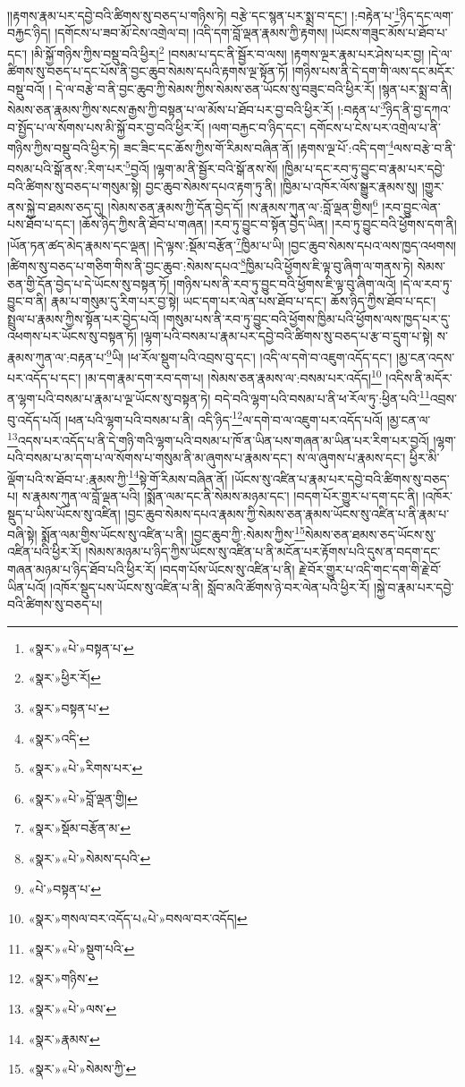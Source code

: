 །།རྟགས་རྣམ་པར་དབྱེ་བའི་ཚིགས་སུ་བཅད་པ་གཉིས་ཏེ། བརྩེ་དང་སྙན་པར་སྨྲ་བ་དང་། །:བརྟེན་པ་\footnote{«སྣར་»«པེ་»བསྟན་པ་}ཉིད་དང་ལག་བརྐྱང་ཉིད། །དགོངས་པ་ཟབ་མོ་ངེས་འགྲེལ་བ། །འདི་དག་བློ་ལྡན་རྣམས་ཀྱི་རྟགས། །ཡོངས་གཟུང་མོས་པ་ཐོབ་པ་དང་། །མི་སྐྱོ་གཉིས་ཀྱིས་བསྡུ་བའི་ཕྱིར།\footnote{«སྣར་»ཕྱིར་རོ།} །བསམ་པ་དང་ནི་སྦྱོར་བ་ལས། །རྟགས་ལྔར་རྣམ་པར་ཤེས་པར་བྱ། །དེ་ལ་ཚིགས་སུ་བཅད་པ་དང་པོས་ནི་བྱང་ཆུབ་སེམས་དཔའི་རྟགས་ལྔ་སྟོན་ཏོ། །གཉིས་པས་ནི་དེ་དག་གི་ལས་དང་མདོར་བསྡུ་བའོ། །
དེ་ལ་བརྩེ་བ་ནི་བྱང་ཆུབ་ཀྱི་སེམས་ཀྱིས་སེམས་ཅན་ཡོངས་སུ་བཟུང་བའི་ཕྱིར་རོ། །སྙན་པར་སྨྲ་བ་ནི། སེམས་ཅན་རྣམས་ཀྱིས་སངས་རྒྱས་ཀྱི་བསྟན་པ་ལ་མོས་པ་ཐོབ་པར་བྱ་བའི་ཕྱིར་རོ། །:བརྟན་པ་\footnote{«སྣར་»བསྟན་པ་}ཉིད་ནི་བྱ་དཀའ་བ་སྤྱོད་པ་ལ་སོགས་པས་མི་སྐྱོ་བར་བྱ་བའི་ཕྱིར་རོ། །ལག་བརྐྱང་བ་ཉིད་དང་། དགོངས་པ་ངེས་པར་འགྲེལ་པ་ནི་གཉིས་ཀྱིས་བསྡུ་བའི་ཕྱིར་ཏེ། ཟང་ཟིང་དང་ཆོས་ཀྱིས་གོ་རིམས་བཞིན་ནོ། །རྟགས་ལྔ་པོ་:འདི་དག་\footnote{«སྣར་»འདི་}ལས་བརྩེ་བ་ནི་བསམ་པའི་སྒོ་ནས་:རིག་པར་\footnote{«སྣར་»«པེ་»རིགས་པར་}བྱའོ། །ལྷག་མ་ནི་སྦྱོར་བའི་སྒོ་ནས་སོ། །ཁྱིམ་པ་དང་རབ་ཏུ་བྱུང་བ་རྣམ་པར་དབྱེ་བའི་ཚིགས་སུ་བཅད་པ་གསུམ་སྟེ། བྱང་ཆུབ་སེམས་དཔའ་རྟག་ཏུ་ནི། །ཁྱིམ་པ་འཁོར་ལོས་སྒྱུར་རྣམས་སུ། །གྱུར་ནས་སྐྱེ་བ་ཐམས་ཅད་དུ། །སེམས་ཅན་རྣམས་ཀྱི་དོན་བྱེད་དོ། །ས་རྣམས་ཀུན་ལ་:བློ་ལྡན་གྱིས།\footnote{«སྣར་»«པེ་»བློ་ལྡན་གྱི།} །རབ་བྱུང་ལེན་པས་ཐོབ་པ་དང་། །ཆོས་ཉིད་ཀྱིས་ནི་ཐོབ་པ་གཞན། །རབ་ཏུ་བྱུང་བ་སྟོན་བྱེད་ཡིན། །རབ་ཏུ་བྱུང་བའི་ཕྱོགས་དག་ནི། །ཡོན་ཏན་ཚད་མེད་རྣམས་དང་ལྡན། །དེ་ལྟས་:སྡོམ་བརྩོན་\footnote{«སྣར་»སྡོམ་བརྩོན་མ་}ཁྱིམ་པ་ཡི། །བྱང་ཆུབ་སེམས་དཔའ་ལས་ཁྱད་འཕགས། །ཚིགས་སུ་བཅད་པ་གཅིག་གིས་ནི་བྱང་ཆུབ་:སེམས་དཔའ་\footnote{«སྣར་»«པེ་»སེམས་དཔའི་}ཁྱིམ་པའི་ཕྱོགས་ཇི་ལྟ་བུ་ཞིག་ལ་གནས་ཏེ། སེམས་ཅན་གྱི་དོན་བྱེད་པ་དེ་ཡོངས་སུ་བསྟན་ཏོ། །གཉིས་པས་ནི་རབ་ཏུ་བྱུང་བའི་ཕྱོགས་ཇི་ལྟ་བུ་ཞིག་ལའོ། །དེ་ལ་རབ་ཏུ་བྱུང་བ་ནི། རྣམ་པ་གསུམ་དུ་རིག་པར་བྱ་སྟེ། ཡང་དག་པར་ལེན་པས་ཐོབ་པ་དང་། ཆོས་ཉིད་ཀྱིས་ཐོབ་པ་དང་། སྤྲུལ་པ་རྣམས་ཀྱིས་སྟོན་པར་བྱེད་པའོ། །གསུམ་པས་ནི་རབ་ཏུ་བྱུང་བའི་ཕྱོགས་ཁྱིམ་པའི་ཕྱོགས་ལས་ཁྱད་པར་དུ་འཕགས་པར་ཡོངས་སུ་བསྟན་ཏོ། །ལྷག་པའི་བསམ་པ་རྣམ་པར་དབྱེ་བའི་ཚིགས་སུ་བཅད་པ་རྩ་བ་དྲུག་པ་སྟེ། ས་རྣམས་ཀུན་ལ་:བརྟན་པ་\footnote{«པེ་»བསྟན་པ་}ཡི། །ཕ་རོལ་སྡུག་པའི་འབྲས་བུ་དང་། །འདི་ལ་དགེ་བ་འཇུག་འདོད་དང་། །མྱ་ངན་འདས་པར་འདོད་པ་དང་། །མ་དག་རྣམ་དག་རབ་དག་པ། །སེམས་ཅན་རྣམས་ལ་:བསམ་པར་འདོད།\footnote{«སྣར་»གསལ་བར་འདོད་པ«པེ་»བསལ་བར་འདོད།} །འདིས་ནི་མདོར་ན་ལྷག་པའི་བསམ་པ་རྣམ་པ་ལྔ་ཡོངས་སུ་བསྟན་ཏེ། བདེ་བའི་ལྷག་པའི་བསམ་པ་ནི་ཕ་རོལ་ཏུ་:ཕྱིན་པའི་\footnote{«སྣར་»«པེ་»སྡུག་པའི་}འབྲས་བུ་འདོད་པའོ། །ཕན་པའི་ལྷག་པའི་བསམ་པ་ནི། འདི་ཉིད་\footnote{«སྣར་»གཉིས་}ལ་དགེ་བ་ལ་འཇུག་པར་འདོད་པའོ། །མྱ་ངན་ལ་\footnote{«སྣར་»«པེ་»ལས་}འདས་པར་འདོད་པ་ནི་དེ་གཉི་གའི་ལྷག་པའི་བསམ་པ་ཁོ་ན་ཡིན་པས་གཞན་མ་ཡིན་པར་རིག་པར་བྱའོ། །ལྷག་པའི་བསམ་པ་མ་དག་པ་ལ་སོགས་པ་གསུམ་ནི་མ་ཞུགས་པ་རྣམས་དང་། ས་ལ་ཞུགས་པ་རྣམས་དང་། ཕྱིར་མི་ལྡོག་པའི་ས་ཐོབ་པ་:རྣམས་ཀྱི་\footnote{«སྣར་»རྣམས་}སྟེ་གོ་རིམས་བཞིན་ནོ། །ཡོངས་སུ་འཛིན་པ་རྣམ་པར་དབྱེ་བའི་ཚིགས་སུ་བཅད་པ། ས་རྣམས་ཀུན་ལ་བློ་ལྡན་པའི། །སྨོན་ལམ་དང་ནི་སེམས་མཉམ་དང་། །བདག་པོར་གྱུར་པ་དག་དང་ནི། །འཁོར་སྡུད་པ་ཡིས་ཡོངས་སུ་འཛིན། །བྱང་ཆུབ་སེམས་དཔའ་རྣམས་ཀྱི་སེམས་ཅན་རྣམས་ཡོངས་སུ་འཛིན་པ་ནི་རྣམ་པ་བཞི་སྟེ། སྨོན་ལམ་གྱིས་ཡོངས་སུ་འཛིན་པ་ནི། །བྱང་ཆུབ་ཀྱི་:སེམས་ཀྱིས་\footnote{«སྣར་»«པེ་»སེམས་ཀྱི་}སེམས་ཅན་ཐམས་ཅད་ཡོངས་སུ་འཛིན་པའི་ཕྱིར་རོ། །སེམས་མཉམ་པ་ཉིད་ཀྱིས་ཡོངས་སུ་འཛིན་པ་ནི་མངོན་པར་རྟོགས་པའི་དུས་ན་བདག་དང་གཞན་མཉམ་པ་ཉིད་ཐོབ་པའི་ཕྱིར་རོ། །བདག་པོས་ཡོངས་སུ་འཛིན་པ་ནི། རྗེ་བོར་གྱུར་པ་འདི་གང་དག་གི་རྗེ་བོ་ཡིན་པའོ། །འཁོར་སྡུད་པས་ཡོངས་སུ་འཛིན་པ་ནི། སློབ་མའི་ཚོགས་ཉེ་བར་ལེན་པའི་ཕྱིར་རོ། །སྐྱེ་བ་རྣམ་པར་དབྱེ་བའི་ཚིགས་སུ་བཅད་པ། 